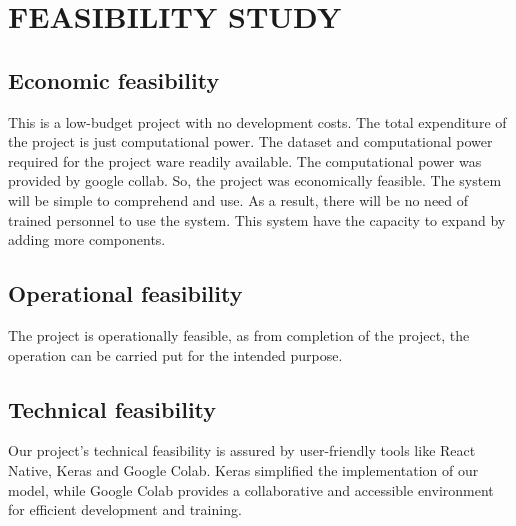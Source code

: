 
\section{FEASIBILITY STUDY}
\subsection{Economic feasibility}
This is a low-budget project with no development costs. The total expenditure of the
project is just computational power. The dataset and computational power required for
the project ware readily available. The computational power was provided by google
collab. So, the project was economically feasible. The system will be simple to
comprehend and use. As a result, there will be no need of trained personnel to use the
system. This system have the capacity to expand by adding more components.

\subsection{Operational feasibility}
The project is operationally feasible, as from  completion of the project, the operation can be carried put for the intended purpose.

\subsection{Technical feasibility}
Our project's technical feasibility is assured by user-friendly tools like React Native, Keras and Google Colab. Keras simplified the implementation of our model, while Google Colab provides a collaborative and accessible environment for efficient development and training. 